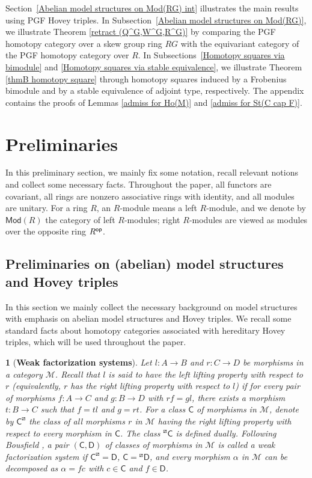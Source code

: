 \documentclass[12pt,twoside]{amsart}
\theoremstyle{bfupright head,slanted body}
\theoremstyle{bfupright head,upright body}
\newtheorem{bfhpg}[res]{}               \newtheorem*{bfhpg*}{}
\theoremstyle{fixed bf head,slanted body}
\theoremstyle{fixed bf head,upright body}
\theoremstyle{numbered paragraph}
\numberwithin{equation}{res}
\newcommand{\calM}{\mathcal{M}}
\newcommand{\sfC}{\mathsf{C}}
\newcommand{\sfD}{\mathsf{D}}
\newcommand{\Mod}{\mathsf{Mod}}
\newcommand{\op}{\sf op}
\begin{document}
Section~\ref{Abelian model structures on Mod(RG) int} illustrates the main results using PGF Hovey triples.
In Subsection~\ref{Abelian model structures on Mod(RG)}, we illustrate Theorem \ref{retract (Q^G,W^G,R^G)} by comparing the PGF homotopy category over a skew group ring $RG$ with the equivariant category of the PGF homotopy category over $R$.
In Subsections~\ref{Homotopy squares via bimodule} and \ref{Homotopy squares via stable equivalence}, we illustrate Theorem \ref{thmB homotopy square} through homotopy squares induced by a Frobenius bimodule and by a stable equivalence of adjoint type, respectively.
The appendix contains the proofs of Lemmas \ref{admiss for Ho(M)} and \ref{admiss for St(C cap F)}.


\section{Preliminaries} \label{sec1}
\noindent In this preliminary section, we mainly fix some notation, recall relevant notions and collect some necessary facts.
{\sf Throughout the paper}, all functors are covariant, all rings are nonzero associative rings with identity, and all modules are unitary. For a ring \(R\), an \(R\)-module means a left \(R\)-module, and we denote by \(\Mod(R)\) the category of left \(R\)-modules; right \(R\)-modules are viewed as modules over the opposite ring \(R^{\op}\).


\subsection{Preliminaries on (abelian) model structures and Hovey triples}
\label{Preliminaries}%
In this section we mainly collect the necessary background on model structures with emphasis on abelian model structures and Hovey triples. We recall some standard facts about homotopy categories associated with hereditary Hovey triples, which will be used throughout the paper.

\begin{bfhpg}[\bf Weak factorization systems]
Let \(l: A \to B\) and \(r: C \to D\) be morphisms in a category \(\calM\). Recall that \(l\) is said to have the {\it left lifting property} with respect to \(r\) (equivalently, \(r\) has the {\it right lifting property} with respect to \(l\)) if for every pair of morphisms \(f: A \to C\) and \(g: B \to D\) with \(rf = gl\), there exists a morphism \(t: B \to C\) such that \(f = tl\) and \(g = rt\). For a class \(\sfC\) of morphisms in \(\calM\), denote by \(\sfC^{\boxslash}\) the class of all morphisms \(r\) in \(\calM\) having the right lifting property with respect to every morphism in \(\sfC\). The class \(^{\boxslash}\sfC\) is defined dually.
Following Bousfield \cite{Bo77}, a pair \((\sfC,\sfD)\) of classes of morphisms in \(\calM\) is called a {\it weak factorization system} if \(\sfC^{\boxslash}=\sfD\), \(\sfC={^{\boxslash}\sfD}\), and every morphism \(\alpha\) in \(\calM\) can be decomposed as \(\alpha = f c\) with \(c\in\sfC\) and \(f\in\sfD\).
\end{bfhpg}
\end{document}
